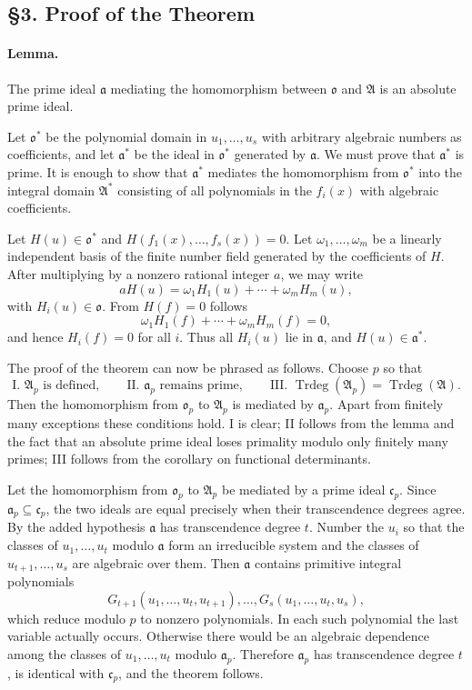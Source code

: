 \documentclass[11pt]{article}
\providecommand{\frakA}{\mathfrak A}
\providecommand{\frako}{\mathfrak o}
\providecommand{\fraka}{\mathfrak a}
\providecommand{\frakc}{\mathfrak c}
\providecommand{\Trdeg}{\operatorname{Trdeg}}
\begin{document}
\subsection*{§3. Proof of the Theorem}

\paragraph{Lemma.}
The prime ideal \(\fraka\) mediating the homomorphism between \(\frako\) and \(\frakA\) is an absolute prime ideal.

Let \(\frako^*\) be the polynomial domain in \(u_1,\ldots,u_s\) with arbitrary algebraic numbers as coefficients, and let \(\fraka^*\) be the ideal in \(\frako^*\) generated by \(\fraka\). We must prove that \(\fraka^*\) is prime. It is enough to show that \(\fraka^*\) mediates the homomorphism from \(\frako^*\) into the integral domain \(\frakA^*\) consisting of all polynomials in the \(f_i(x)\) with algebraic coefficients.

Let \(H(u)\in\frako^*\) and \(H(f_1(x),\ldots,f_s(x))=0\). Let \(\omega_1,\ldots,\omega_m\) be a linearly independent basis of the finite number field generated by the coefficients of \(H\). After multiplying by a nonzero rational integer \(a\), we may write
\[
        aH(u)=\omega_1H_1(u)+\cdots+\omega_mH_m(u),
\]
with \(H_i(u)\in\frako\). From \(H(f)=0\) follows
\[
        \omega_1H_1(f)+\cdots+\omega_mH_m(f)=0,
\]
and hence \(H_i(f)=0\) for all \(i\). Thus all \(H_i(u)\) lie in \(\fraka\), and \(H(u)\in\fraka^*\).

The proof of the theorem can now be phrased as follows. Choose \(p\) so that
\[
\text{I. }\frakA_p\text{ is defined},\qquad
\text{II. }\fraka_p\text{ remains prime},\qquad
\text{III. }\Trdeg(\frakA_p)=\Trdeg(\frakA).
\]
Then the homomorphism from \(\frako_p\) to \(\frakA_p\) is mediated by \(\fraka_p\). Apart from finitely many exceptions these conditions hold. I is clear; II follows from the lemma and the fact that an absolute prime ideal loses primality modulo only finitely many primes; III follows from the corollary on functional determinants.

Let the homomorphism from \(\frako_p\) to \(\frakA_p\) be mediated by a prime ideal \(\frakc_p\). Since \(\fraka_p\subseteq\frakc_p\), the two ideals are equal precisely when their transcendence degrees agree. By the added hypothesis \(\fraka\) has transcendence degree \(t\). Number the \(u_i\) so that the classes of \(u_1,\ldots,u_t\) modulo \(\fraka\) form an irreducible system and the classes of \(u_{t+1},\ldots,u_s\) are algebraic over them. Then \(\fraka\) contains primitive integral polynomials
\[
        G_{t+1}(u_1,\ldots,u_t,u_{t+1}),\ldots,
        G_s(u_1,\ldots,u_t,u_s),
\]
which reduce modulo \(p\) to nonzero polynomials. In each such polynomial the last variable actually occurs. Otherwise there would be an algebraic dependence among the classes of \(u_1,\ldots,u_t\) modulo \(\fraka_p\). Therefore \(\fraka_p\) has transcendence degree \(t\), is identical with \(\frakc_p\), and the theorem follows.
\end{document}
